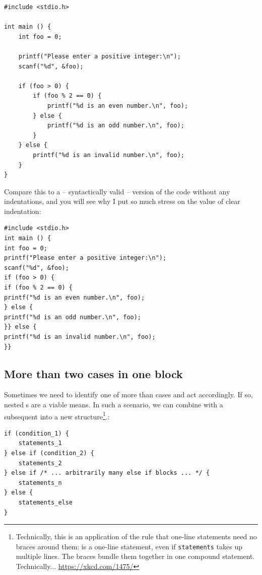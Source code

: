 \begin{codebox}[ifElseNested.c]
\begin{verbatim}
#include <stdio.h>

int main () {
    int foo = 0;
  
    printf("Please enter a positive integer:\n");
    scanf("%d", &foo);

    if (foo > 0) {
        if (foo % 2 == 0) {
            printf("%d is an even number.\n", foo);
        } else {
            printf("%d is an odd number.\n", foo);
        }
    } else {
        printf("%d is an invalid number.\n", foo);
    }
}
\end{verbatim}
\end{codebox}

Compare this to a -- syntactically valid -- version of the code without any indentations, and you will see why I put so much stress on the value of clear indentation:

\begin{warnbox}[ifElseNestedNotIndented.c, leftupper=7mm]
\begin{verbatim}
#include <stdio.h>
int main () {
int foo = 0;  
printf("Please enter a positive integer:\n");
scanf("%d", &foo);
if (foo > 0) {
if (foo % 2 == 0) {
printf("%d is an even number.\n", foo);
} else {
printf("%d is an odd number.\n", foo);
}} else {
printf("%d is an invalid number.\n", foo);
}}
\end{verbatim}
\end{warnbox}


\subsection{More than two cases in one  block}
Sometimes we need to identify one of more than cases and act accordingly. If so, nested s are a viable means. In such a scenario, we can combine  with a subsequent  into a new structure\footnote{Technically, this is an application of the rule that one-line statements need no braces around them:  is a one-line statement, even if \texttt{statements} takes up multiple lines. The braces bundle them together in one compound statement. Technically... \url{https://xkcd.com/1475/}}.:

\begin{codebox}
\begin{verbatim}
if (condition_1) {
    statements_1
} else if (condition_2) {
    statements_2
} else if /* ... arbitrarily many else if blocks ... */ {
    statements_n
} else {
    statements_else
}
\end{verbatim}
\end{codebox}

